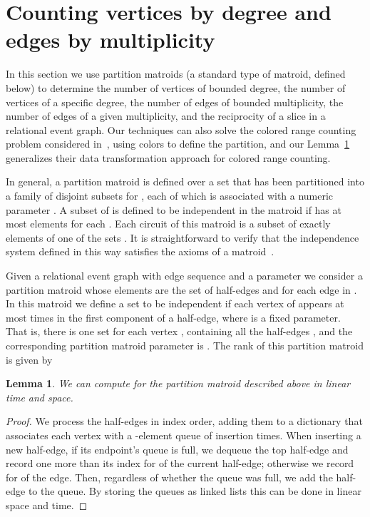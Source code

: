 \documentclass[11pt]{article}
\newtheorem{lemma}{Lemma}
\begin{document}
\section{Counting vertices by degree and edges by multiplicity}
In this section we use partition matroids (a standard type of matroid, defined below) to determine the number of vertices of bounded degree, the number of vertices of a specific degree, the number of edges of bounded multiplicity, the number of edges of a given multiplicity, and the reciprocity of a slice in a relational event graph. Our techniques can also solve the colored range counting problem considered in~\cite{ColorRangeQueries}, using colors to define the partition, and our Lemma~\ref{lem:vertex-degree} generalizes their data transformation approach for colored range counting.

In general, a partition matroid is defined over a set  that has been partitioned into a family of disjoint subsets  for , each of which is associated with a numeric parameter . A subset  of  is defined to be independent in the matroid if  has at most  elements for each . Each circuit of this matroid is a subset of exactly  elements of one of the sets . It is straightforward to verify that the independence system defined in this way satisfies the axioms of a matroid~\cite{Welsh10}.

Given a relational event graph  with edge sequence  and a parameter  we consider a partition matroid whose elements are the set of half-edges  and  for each edge  in . In this matroid we define a set  to be independent if each vertex of  appears at most  times in the first component of a half-edge, where  is a fixed parameter. That is, there is one set  for each vertex , containing all the half-edges , and the corresponding partition matroid parameter is . The rank of this partition matroid is given by 

\begin{lemma}\label{lem:vertex-degree}
We can compute  for the partition matroid described above in linear time and space.
\end{lemma}
\begin{proof}
We process the half-edges in index order, adding them to a dictionary that associates each vertex with a -element queue of insertion times. When inserting a new half-edge, if its endpoint's queue is full, we dequeue the top half-edge and record one more than its index for  of the current half-edge; otherwise we record  for  of the edge. Then, regardless of whether the queue was full, we add the half-edge to the queue. By storing the queues as linked lists this can be done in linear space and time.
\end{proof}
\end{document}
